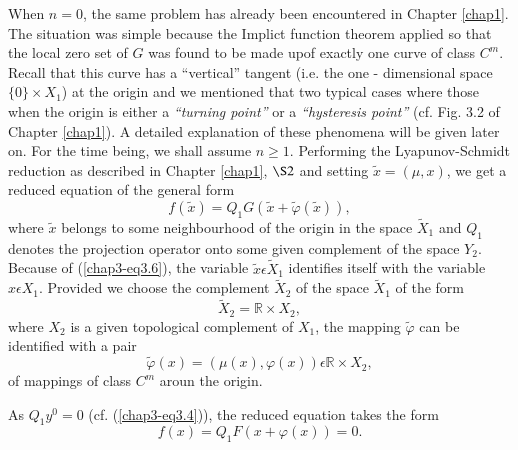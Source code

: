 When $n = 0$, the same problem has already been encountered in Chapter
\ref{chap1}. The situation was simple because the Implict function
theorem applied so that the local zero set of $G$ was found to be made
up\pageoriginale of exactly one curve of class $C^{m}$. Recall that
this curve has a ``vertical'' tangent (i.e. the one - dimensional
space $\{0\} \times X_{1}$) at the origin and we mentioned that two
typical cases where those when the origin is either a {\em ``turning
  point''} or a {\em ``hysteresis point''} (cf. Fig. 3.2 of Chapter
\ref{chap1}). A detailed explanation of these phenomena will be given
later on. For the time being, we shall assume $n \geq 1$. Performing
the Lyapunov-Schmidt reduction as described in Chapter \ref{chap1},
$\S 2$ and setting $\widetilde{x} = (\mu, x)$, we get a reduced
equation of the general form 
$$
f(\widetilde{x}) = Q_{1}G(\widetilde{x} + \widetilde{\varphi}(\widetilde{x})),
$$
where $\widetilde{x}$ belongs to some neighbourhood of the origin in
the space $\widetilde{X}_{1}$ and $Q_{1}$ denotes the projection
operator onto some given complement of the space $Y_{2}$. Because of
(\ref{chap3-eq3.6}), the variable $\widetilde{x} \epsilon
\widetilde{X}_{1}$ identifies itself with the variable $x \epsilon
X_{1}$. Provided we choose the complement $\widetilde{X}_{2}$ of the
space $\widetilde{X}_{1}$ of the form
$$
\widetilde{X}_{2} = \mathbb{R} \times X_{2},
$$
where $X_{2}$ is a given topological complement of $X_{1}$, the
mapping $\widetilde{\varphi}$ can be identified with a pair
$$
\widetilde{\varphi}(x) = (\mu(x), \varphi(x)) \epsilon \mathbb{R}
\times X_{2},
$$
of mappings of class $C^{m}$ aroun the origin.

As $Q_{1}y^{0} = 0$ (cf. (\ref{chap3-eq3.4})), the reduced equation
takes the form 
\begin{equation*}
f(x) = Q_{1}F(x + \varphi(x)) = 0.\tag{3.7}\label{chap3-eq3.7}
\end{equation*}

